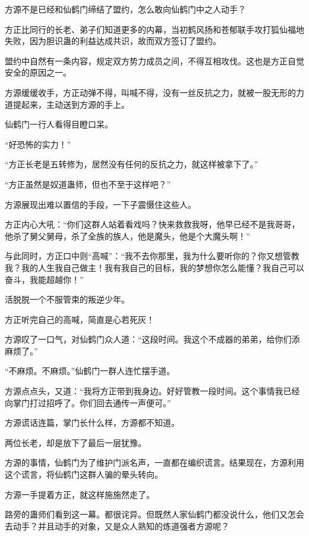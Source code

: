 
\begin{this_body}

方源不是已经和仙鹤门缔结了盟约，怎么敢向仙鹤门中之人动手？

方正比同行的长老、弟子们知道更多的内幕，当初鹤风扬和苍郁联手攻打狐仙福地失败，因为胆识蛊的利益达成共识，故而双方签订了盟约。

盟约中自然有一条内容，规定双方势力成员之间，不得互相攻伐。这也是方正自觉安全的原因之一。

方源缓缓收手，方正动弹不得，叫喊不得，没有一丝反抗之力，就被一股无形的力道提起来，主动送到方源的手上。

仙鹤门一行人看得目瞪口呆。

“好恐怖的实力！”

“方正长老是五转修为，居然没有任何的反抗之力，就这样被拿下了。”

“方正虽然是奴道蛊师，但也不至于这样吧？”

方源展现出难以置信的手段，一下子震慑住这些人。

方正内心大吼：“你们这群人站着看戏吗？快来救救我呀，他早已经不是我哥哥，他杀了舅父舅母，杀了全族的族人，他是魔头，他是个大魔头啊！”

与此同时，方正口中则“高喊”：“我不去你那里，我为什么要听你的？你又想管教我？我的人生我自己做主！我有我自己的目标，我的梦想你怎么能懂？我自己可以奋斗，我能超越你！”

活脱脱一个不服管束的叛逆少年。

方正听完自己的高喊，简直是心若死灰！

方源叹了一口气，对仙鹤门众人道：“这段时间。我这个不成器的弟弟，给你们添麻烦了。”

“不麻烦。不麻烦。”仙鹤门一群人连忙摆手道。

方源点点头，又道：“我将方正带到我身边。好好管教一段时间。这个事情我已经向掌门打过招呼了。你们回去通传一声便可。”

方源谎话连篇，掌门长什么样，方源都不知道。

两位长老，却是放下了最后一层犹豫。

方源的事情，仙鹤门为了维护门派名声，一直都在编织谎言。结果现在，方源利用这个谎言，将仙鹤门这群人骗的晕头转向。

方源一手提着方正，就这样施施然走了。

路旁的蛊师们看到这一幕。都很诧异。但既然人家仙鹤门都没说什么，他们又怎会去动手？并且动手的对象，又是众人熟知的炼道强者方源呢？


\end{this_body}

